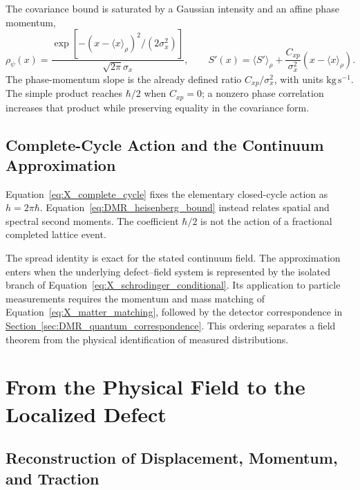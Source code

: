 The covariance bound is saturated by a Gaussian intensity and an affine phase momentum,
\begin{equation}
 \rho_\psi(x)=
 \frac{\exp[-(x-\langle x\rangle_\rho)^2/(2\sigma_x^2)]}
 {\sqrt{2\pi}\sigma_x},
 \qquad
 S'(x)=\langle S'\rangle_\rho+
 \frac{C_{xp}}{\sigma_x^2}(x-\langle x\rangle_\rho).
\label{eq:DMR_gaussian_equality}
\end{equation}
The phase-momentum slope is the already defined ratio $C_{xp}/\sigma_x^2$, with units $\mathrm{kg\,s^{-1}}$. The simple product reaches $\hbar/2$ when $C_{xp}=0$; a nonzero phase correlation increases that product while preserving equality in the covariance form.

\subsection{Complete-Cycle Action and the Continuum Approximation}

Equation~\eqref{eq:X_complete_cycle} fixes the elementary closed-cycle action as $h=2\pi\hbar$. Equation~\eqref{eq:DMR_heisenberg_bound} instead relates spatial and spectral second moments. The coefficient $\hbar/2$ is not the action of a fractional completed lattice event.

The spread identity is exact for the stated continuum field. The approximation enters when the underlying defect--field system is represented by the isolated branch of Equation~\eqref{eq:X_schrodinger_conditional}. Its application to particle measurements requires the momentum and mass matching of Equation~\eqref{eq:X_matter_matching}, followed by the detector correspondence in \hyperref[sec:DMR_quantum_correspondence]{Section~\ref*{sec:DMR_quantum_correspondence}}. This ordering separates a field theorem from the physical identification of measured distributions.

\section{From the Physical Field to the Localized Defect}
\label{sec:DMR_field_defect}

\subsection{Reconstruction of Displacement, Momentum, and Traction}

